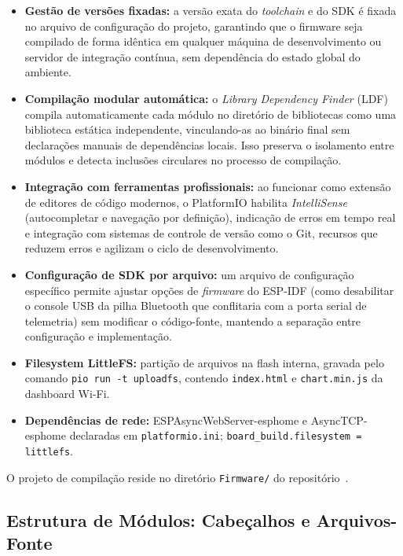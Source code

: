 \begin{itemize}
    \item \textbf{Gestão de versões fixadas:} a versão exata do \textit{toolchain} e do SDK é fixada no arquivo de configuração do projeto, garantindo que o firmware seja compilado de forma idêntica em qualquer máquina de desenvolvimento ou servidor de integração contínua, sem dependência do estado global do ambiente.
    \item \textbf{Compilação modular automática:} o \textit{Library Dependency Finder} (LDF) compila automaticamente cada módulo no diretório de bibliotecas como uma biblioteca estática independente, vinculando-as ao binário final sem declarações manuais de dependências locais. Isso preserva o isolamento entre módulos e detecta inclusões circulares no processo de compilação.
    \item \textbf{Integração com ferramentas profissionais:} ao funcionar como extensão de editores de código modernos, o PlatformIO habilita \textit{IntelliSense} (autocompletar e navegação por definição), indicação de erros em tempo real e integração com sistemas de controle de versão como o Git, recursos que reduzem erros e agilizam o ciclo de desenvolvimento.
    \item \textbf{Configuração de SDK por arquivo:} um arquivo de configuração específico permite ajustar opções de \textit{firmware} do ESP-IDF (como desabilitar o console USB da pilha Bluetooth que conflitaria com a porta serial de telemetria) sem modificar o código-fonte, mantendo a separação entre configuração e implementação.
    \item \textbf{Filesystem LittleFS:} partição de arquivos na flash interna, gravada pelo comando \texttt{pio run -t uploadfs}, contendo \texttt{index.html} e \texttt{chart.min.js} da dashboard Wi-Fi.
    \item \textbf{Dependências de rede:} ESPAsyncWebServer-esphome e AsyncTCP-esphome declaradas em \texttt{platformio.ini}; \texttt{board\_build.filesystem = littlefs}.
\end{itemize}

O projeto de compilação reside no diretório \texttt{Firmware/} do repositório~\cite{esp32BldcEscRepo}.

\subsection{Estrutura de Módulos: Cabeçalhos e Arquivos-Fonte}


